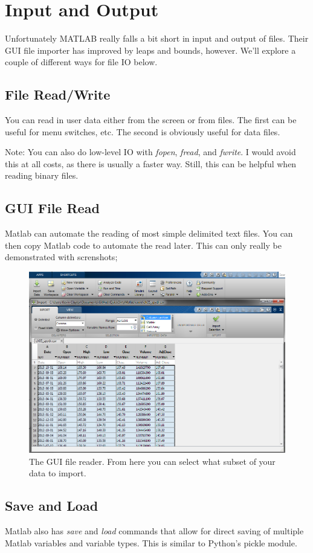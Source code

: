 
\pagebreak
\section{Input and Output}
Unfortunately MATLAB really falls a bit short in input and output of files.
 Their GUI file importer has improved by leaps and bounds, however.
 We'll explore a couple of different ways for file IO below.

\subsection{File Read/Write}
You can read in user data either from the screen or from files.
 The first can be useful for menu switches, etc.
 The second is obviously useful for data files.

\begin{quote}

\end{quote}

Note: You can also do low-level IO with \emph{fopen}, \emph{fread}, and \emph{fwrite}.
 I would avoid this at all costs, as there is usually a faster way.
 Still, this can be helpful when reading binary files.

\pagebreak
\subsection{GUI File Read}
Matlab can automate the reading of most simple delimited text files.
 You can then copy Matlab code to automate the read later.
 This can only really be demonstrated with screnshots;

\begin{figure}[ht!]
\centering
\includegraphics[width=120mm]{img/guiload.png}
\caption{The GUI file reader. From here you can select what subset of your data to import.}
\label{guiload}
\end{figure}

\pagebreak
\subsection{Save and Load}
Matlab also has \emph{save} and \emph{load} commands that allow for direct saving of multiple Matlab variables and variable types.
 This is similar to Python's pickle module.

\begin{quote}
 
\end{quote}

